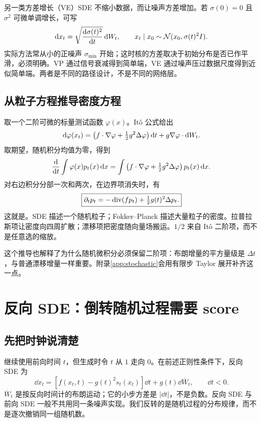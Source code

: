另一类方差增长（VE）SDE 不缩小数据，而让噪声方差增加。若 $\sigma(0)=0$ 且 $\sigma^2$ 可微单调增长，可写
\begin{equation}
 \mathop{}\!\mathrm{d} x_t=\sqrt{\frac{\mathop{}\!\mathrm{d}\sigma(t)^2}{\mathop{}\!\mathrm{d} t}}\mathop{}\!\mathrm{d} W_t,
 \qquad x_t\mid x_0\sim\mathcal{N}(x_0,\sigma(t)^2I).
\end{equation}
实际方法常从小的正噪声 $\sigma_{\min}$ 开始；这时核的方差取决于初始分布是否已作平滑，必须明确。VP 通过信号衰减得到简单端，VE 通过噪声压过数据尺度得到近似简单端。两者是不同的路径设计，不是不同的网络层。

\subsection{从粒子方程推导密度方程}
取一个二阶可微的标量测试函数 $\varphi(x)$。It\^o 公式给出
\begin{equation}
 \mathop{}\!\mathrm{d}\varphi(x_t)=\left(f\cdot\nabla\varphi+\tfrac12g^2\Delta\varphi\right)\mathop{}\!\mathrm{d} t
 +g\nabla\varphi\cdot\mathop{}\!\mathrm{d} W_t.
\end{equation}
取期望，随机积分均值为零，得到
\begin{equation}
 \frac{\mathop{}\!\mathrm{d}}{\mathop{}\!\mathrm{d} t}\int\varphi(x)p_t(x)\mathop{}\!\mathrm{d} x
 =\int\left(f\cdot\nabla\varphi+\tfrac12g^2\Delta\varphi\right)p_t(x)\mathop{}\!\mathrm{d} x.
\end{equation}
对右边积分分部一次和两次，在边界项消失时，有
\begin{equation}\boxed{
 \partial_tp_t=-\operatorname{div}(f p_t)+\tfrac12g(t)^2\Delta p_t.
 }\label{eq:fokker-planck}\end{equation}
这就是。SDE 描述一个随机粒子；Fokker--Planck 描述大量粒子的密度。拉普拉斯项让密度向四周扩散；漂移项把密度随向量场搬运。$1/2$ 来自 It\^o 二阶项，而不是任意选的缩放。

这个推导也解释了为什么随机微积分必须保留二阶项：布朗增量的平方量级是 $\Delta t$，与普通漂移增量一样重要。附录\ref{app:stochastic}会用有限步 Taylor 展开补齐这一点。

\section{反向 SDE：倒转随机过程需要 score}\label{sec:reverse-sde}
\subsection{先把时钟说清楚}
继续使用前向时间 $t$，但生成时令 $t$ 从 $1$ 走向 $0$。在前述正则性条件下，反向 SDE 为\cite{r_anderson,r_sde}
\begin{equation}\boxed{
 \dd x_t=\left[f(x_t,t)-g(t)^2s_t(x_t)\right]\dd t
 +g(t)\dd\overline W_t,\qquad \dd t<0.
 }\label{eq:reverse-sde}\end{equation}
$\overline W_t$ 是按反向时间计的布朗运动；它的小步方差是 $|\dd t|$，不是负数。反向 SDE 与前向 SDE 一般不共用同一条噪声实现。我们反转的是随机过程的分布规律，而不是逐次撤销同一组随机数。

